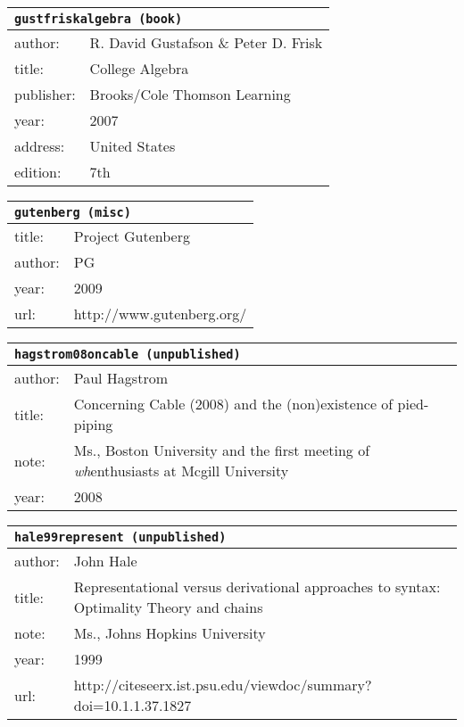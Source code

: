 \documentclass{article}
\begin{document}
\bigskip

\begin{tabular}{p{}p{}}
\multicolumn{2}{l}{\texttt{gustfriskalgebra (book)}}\\
\hline
author: & R. David Gustafson \& Peter D. Frisk\\
title: & College Algebra\\
publisher: & Brooks/Cole Thomson Learning\\
year: & 2007\\
address: & United States\\
edition: & 7th\\
\end{tabular}

\bigskip

\begin{tabular}{p{}p{}}
\multicolumn{2}{l}{\texttt{gutenberg (misc)}}\\
\hline
title: & Project \textsc{G}utenberg\\
author: & PG\\
year: & 2009\\
url: & http://www.gutenberg.org/\\
\end{tabular}

\bigskip

\begin{tabular}{p{}p{}}
\multicolumn{2}{l}{\texttt{hagstrom08oncable (unpublished)}}\\
\hline
author: & Paul Hagstrom\\
title: & Concerning Cable (2008) and the (non)existence of pied-piping\\
note: & \textsc{M}s., Boston University and the first meeting of \textsl{wh}enthusiasts at Mcgill University\\
year: & 2008\\
\end{tabular}

\bigskip

\begin{tabular}{p{}p{}}
\multicolumn{2}{l}{\texttt{hale99represent (unpublished)}}\\
\hline
author: & John Hale\\
title: & Representational versus derivational approaches to syntax: Optimality Theory and chains\\
note: & \textsc{M}s., Johns Hopkins University\\
year: & 1999\\
url: & http://citeseerx.ist.psu.edu/viewdoc/summary?doi=10.1.1.37.1827\\
\end{tabular}
\end{document}
